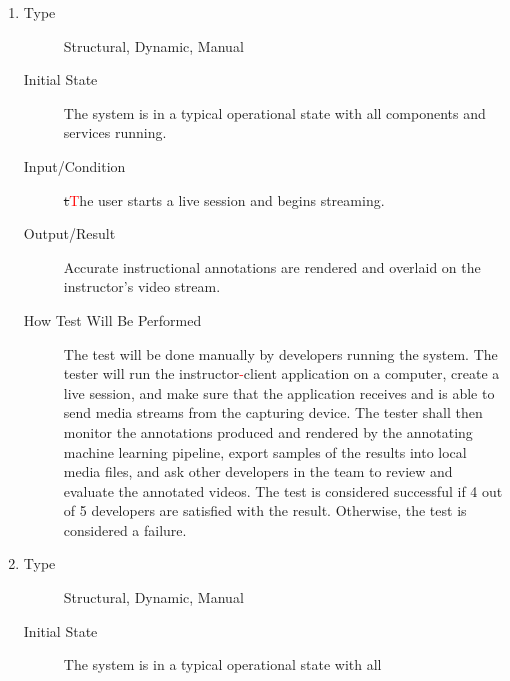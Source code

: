 \documentclass[12pt, titlepage]{article}
\newcommand{\rt}[1]{\textcolor{red}{#1}}
\begin{document}
\begin{enumerate}[NFR-T1]
\item \label{NFRT12}
  \begin{description}
  \item[Type] Structural, Dynamic, Manual
  \item[Initial State] The system is in a typical operational state with all
    components and services running.
  \item[Input/Condition] \sout{t}\rt{T}he user starts a live session and begins streaming.
  \item[Output/Result] Accurate instructional annotations are rendered and
    overlaid on the instructor’s video stream.
  \item[How Test Will Be Performed] The test will be done manually by developers
    running the system. The tester will run the instructor\rt{-}client application on
    a computer, create a live session, and make sure that the application
    receives and is able to send media streams from the capturing device. The
    tester shall then monitor the annotations produced and rendered by the
    annotating machine learning pipeline, export samples of the results into
    local media files, and ask other developers in the team to review and
    evaluate the annotated videos. The test is considered successful if 4 out of
    5 developers are satisfied with the result. Otherwise, the test is
    considered a failure.
  \end{description}
\item \label{NFRT13}
  \begin{description}
  \item[Type] Structural, Dynamic, Manual
  \item[Initial State] The system is in a typical operational state with all

\end{description}
\end{enumerate}
\end{document}
